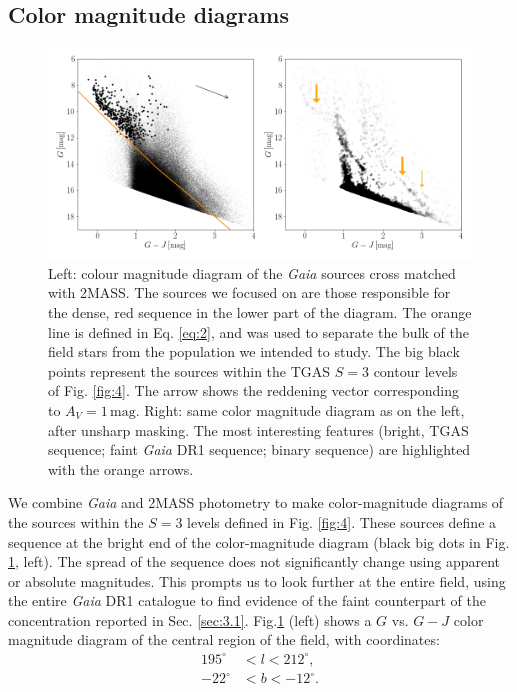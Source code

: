 \documentclass[onecolumn]{aa} %
\begin{document}
\subsection{Color magnitude diagrams}\label{sec:3.2}
\begin{figure}
\includegraphics[width = \hsize]{fig7_new.png}
\caption{Left: colour magnitude diagram of the \textit{Gaia} sources cross matched with 2MASS. The sources we focused on are those responsible for the dense, red sequence in the lower part of the diagram. The orange line is defined in Eq. \eqref{eq:2}, and was used to separate the bulk of the field stars from the population we intended to study. The big black points represent the sources within the TGAS $S = 3$ contour levels of Fig. \ref{fig:4}. The arrow shows the reddening vector corresponding to $A_V = 1 \, \mathrm{mag}$. Right: same color magnitude diagram as on the left, after unsharp masking. The most interesting features (bright, TGAS sequence; faint \textit{Gaia} DR1 sequence; binary sequence) are highlighted with the orange arrows.}
\label{fig:6}
\end{figure}
We combine \textit{Gaia} and 2MASS photometry to make color-magnitude diagrams of the sources within the $S = 3$ levels defined in Fig. \ref{fig:4}. These sources define a sequence at the bright end of the color-magnitude diagram (black big dots in Fig. \ref{fig:6}, left). The spread of the sequence does not significantly change using apparent or absolute magnitudes. 
This prompts us to look further at the entire field, using the entire \textit{Gaia} DR1 catalogue to find evidence of the faint counterpart of the concentration reported in Sec. \ref{sec:3.1}. 
Fig.\ref{fig:6} (left) shows a $G$ vs. $G-J$ color magnitude diagram of the central region of the field, with coordinates:
\begin{align*}
195^{\circ} &< l < 212^{\circ}, \nonumber \\ 
-22^{\circ}  & < b < -12^{\circ}.
\end{align*}
\end{document}
